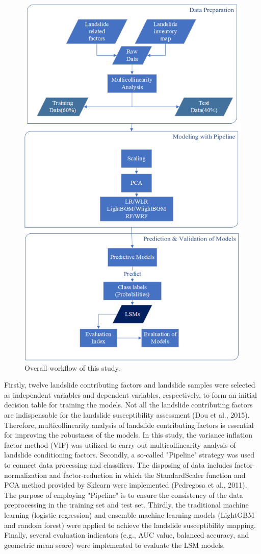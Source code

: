\documentclass[a4paper,fleqn]{cas-sc}
\begin{document}
\begin{figure}
  \centering
  \includegraphics[width=10 cm]{Definitions/Workflow.png}
  \caption{Overall workflow of this study.}
  \label{LSM4RS_FlowChart}
\end{figure}

Firstly, twelve landslide contributing factors and landslide samples were selected as independent variables and dependent variables, respectively, to form an initial decision table for training the models. 
Not all the landslide contributing factors are indispensable for the landslide susceptibility assessment (Dou et al., 2015). 
Therefore, multicollinearity analysis of landslide contributing factors is essential for improving the robustness of the models. 
In this study, the variance inflation factor method (VIF) was utilized to carry out multicollinearity analysis of landslide conditioning factors. 
Secondly, a so-called "Pipeline" strategy was used to connect data processing and classifiers. 
The disposing of data includes factor-normalization and factor-reduction in which the StandardScaler function and PCA method provided by Sklearn were implemented (Pedregosa et al., 2011). 
The purpose of employing "Pipeline" is to ensure the consistency of the data preprocessing in the training set and test set. 
Thirdly, the traditional machine learning (logistic regression) and ensemble machine learning models (LightGBM and random forest) were applied to achieve the landslide susceptibility mapping. 
Finally, several evaluation indicators (e.g., AUC value, balanced accuracy, and geometric mean score) were implemented to evaluate the LSM models.
\end{document}
